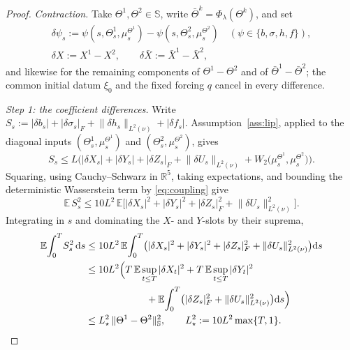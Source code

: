\documentclass[preprint,12pt]{elsarticle}
\newcommand{\R}{\mathbb{R}}
\newcommand{\E}{\mathbb{E}}
\newcommand{\diff}{\mathrm{d}}
\newcommand{\Lnu}{L^2(\nu)}
\newcommand{\HH}{\mathbb{S}}
\newcommand{\Lnorm}[1]{\lVert #1\rVert_{\Lnu}}
\numberwithin{equation}{section}
\theoremstyle{plain}
\theoremstyle{definition}
\theoremstyle{\PaperRemarkStyle}
\begin{document}
\begin{proof}
\emph{Contraction.} Take $\Theta^1,\Theta^2\in\HH$, write $\bar\Theta^k=\Phi_\lambda(\Theta^k)$,
and set
\[
\begin{gathered}
\delta\psi_s:=\psi(s,\Theta^1_s,\mu^{\Theta^1}_s)-\psi(s,\Theta^2_s,\mu^{\Theta^2}_s)
\quad(\psi\in\{b,\sigma,h,f\}),\\[0.4ex]
\delta X:=X^1-X^2,\qquad \delta\bar X:=\bar X^1-\bar X^2 ,
\end{gathered}
\]
and likewise for the remaining components of $\Theta^1-\Theta^2$ and of
$\bar\Theta^1-\bar\Theta^2$; the common initial datum $\xi_0$ and
the fixed forcing $q$ cancel in every difference.

\emph{Step 1: the coefficient differences.} Write
$S_s:=|\delta b_s|+|\delta\sigma_s|_F+\Lnorm{\delta h_s}+|\delta f_s|$. Assumption~\ref{ass:lip},
applied to the diagonal inputs $(\Theta^1_s,\mu^{\Theta^1}_s)$ and $(\Theta^2_s,\mu^{\Theta^2}_s)$,
gives
\[
S_s\le L\Big(|\delta X_s|+|\delta Y_s|+|\delta Z_s|_F+\Lnorm{\delta U_s}
+W_2\big(\mu^{\Theta^1}_s,\mu^{\Theta^2}_s\big)\Big) .
\]
Squaring, using Cauchy--Schwarz in $\R^5$, taking expectations, and bounding the deterministic
Wasserstein term by \eqref{eq:coupling} give
\[
\E\,S_s^2\le 10L^2\,\E\big[|\delta X_s|^2+|\delta Y_s|^2+|\delta Z_s|_F^2+\Lnorm{\delta U_s}^2\big].
\]
Integrating in $s$ and dominating the $X$- and $Y$-slots by their suprema,
\begin{equation}\label{eq:coeffdiff}
\begin{aligned}
\E\!\int_0^T\! S_s^2\,\diff s
&\le 10L^2\,\E\!\int_0^T\!\big(|\delta X_s|^2+|\delta Y_s|^2+|\delta Z_s|_F^2+\Lnorm{\delta U_s}^2\big)\diff s\\
&\le 10L^2\Big(T\,\E\sup_{t\le T}|\delta X_t|^2+T\,\E\sup_{t\le T}|\delta Y_t|^2\\
&\hspace{6.2em}+\E\!\int_0^T\!\big(|\delta Z_s|_F^2+\Lnorm{\delta U_s}^2\big)\diff s\Big)\\
&\le L_\star^2\,\|\Theta^1-\Theta^2\|_{\HH}^2 ,
\qquad L_\star^2:=10L^2\max\{T,1\} .
\end{aligned}
\end{equation}


\end{proof}
\end{document}
